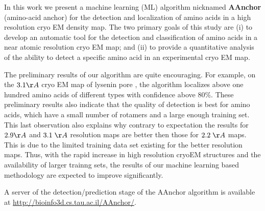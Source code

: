 In this work we present a machine learning (ML) algorithm nicknamed {\bf AAnchor} (amino-acid anchor) for the detection and localization of amino acids in a high resolution cryo EM density map. 
The two primary goals of this study are 
(i) to develop an automatic tool for the detection and classification of amino acids in a near atomic resolution cryo EM map; and 
(ii) to provide a quantitative analysis of the ability to detect a specific amino acid in an experimental cryo EM map.


The preliminary results of our algorithm are quite encouraging.
For example, on the $3.1 \AA$ cryo EM map of lysenin pore \cite{Bokori-Brown2016Cryo-EMProtein}, the algorithm localizes above one hundred amino acids of different types with confidence above $80 \%$.
These preliminary results also indicate that the quality of detection is best for amino acids, which have a small number of rotamers and a large enough training set.  This last observation also explains why
contrary to expectation the results for  $2.9  \AA$ and $3.1 \;\AA$ resolution maps are better then those for $2.2 \;\AA$ maps. This is due to the limited training data set existing for the better resolution maps.  Thus, with the rapid increase in high resolution cryoEM structures and the availability of larger trainng sets, the results of our machine learning based methodology are expected to improve significantly.

A server of the detection/prediction stage of the  AAnchor algorithm is available at \url{http://bioinfo3d.cs.tau.ac.il/AAnchor/}.  










